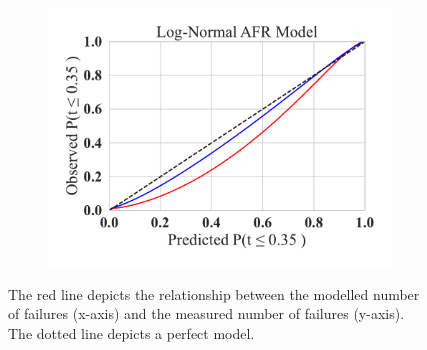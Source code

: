 \documentclass[journal]{IEEEtran}
\begin{document}
\begin{figure}[h!]
\begin{subfigure}[b]{.3\linewidth}
        \includegraphics[width=\linewidth,clip]{plots/combined/log_normal_qq.pdf}
        \caption{}
    \end{subfigure}
    \caption{The red line depicts the relationship between the modelled number of failures (x-axis) and the measured number of failures (y-axis). The dotted line depicts a perfect model.}
    \label{fig:qq}
\end{figure}
\end{document}
